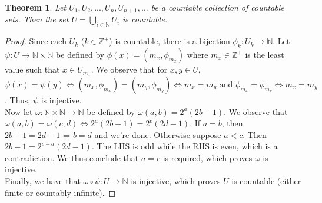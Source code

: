 \documentclass[12pt, a4paper, titlepage, twoside]{article}
\newcommand*{\N}{\mathbb{N}}
\newcommand*{\Z}{\mathbb{Z}}
\newtheorem*{theorem*}{Theorem}
\begin{document}
	\begin{pf}
		\label{apA:ctble-union}
		\begin{theorem*}
			Let $U_1, U_2, ..., U_n, U_{n+1}, ...$ be a countable collection of countable sets. Then the set $U = \bigcup_{i \in \N} U_i$
			is countable.
		\end{theorem*}

		\tcbline		
		
		\begin{proof}
			Since each $U_k$ ($k \in \Z^+$) is countable, there is a bijection $\phi_k : U_k \to \N$. Let $\psi : U \to \N \times \N$ be defined
			by $\phi(x) = (m_x, \phi_{m_x})$ where $m_x \in \Z^+$ is the least value such that $x \in U_{m_x}$. We observe that for 
			$x,y \in U$, 
			$\psi(x) = \psi(y) \iff (m_x, \phi_{m_x}) = (m_y, \phi_{m_y}) \iff m_x = m_y \text{ and } \phi_{m_x} = \phi_{m_y} \iff m_x = m_y$.
			Thus, $\psi$ is injective.\\
			
			Now let $\omega : \N \times \N \to \N$ be defined by $\omega(a,b) = 2^a(2b-1)$. We observe that $\omega(a,b) = \omega(c,d)
			\iff 2^a(2b-1) = 2^c(2d-1)$. If $a = b$, then $2b-1 = 2d-1 \iff b = d$ and we're done. Otherwise suppose $a<c$. Then
			$2b-1 = 2^{c-a}(2d-1)$. The LHS is odd while the RHS is even, which is a contradiction. We thus conclude that $a=c$ is required,
			which proves $\omega$ is injective.\\
			
			Finally, we have that $\omega \circ \psi : U \to \N$ is injective, which proves $U$ is countable (either finite or countably-infinite).
		\end{proof}
	\end{pf}
	
	\newpage	
	
\end{document}
